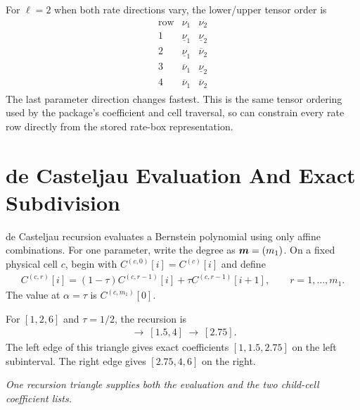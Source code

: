 For $\ell=2$ when both rate directions vary, the lower/upper tensor order is
\begin{gather*}
\begin{array}{c|cc}
\text{row} & \nu_1 & \nu_2\\
\hline
1 & \underline\nu_1 & \underline\nu_2\\
2 & \underline\nu_1 & \overline\nu_2\\
3 & \overline\nu_1 & \underline\nu_2\\
4 & \overline\nu_1 & \overline\nu_2
\end{array}
\end{gather*}
The last parameter direction changes fastest. This is the same tensor ordering used by the package's coefficient and cell traversal, so  can constrain every rate row directly from the stored rate-box representation.

\section{de Casteljau Evaluation And Exact Subdivision}

de Casteljau recursion evaluates a Bernstein polynomial using only affine combinations. For one parameter, write the degree as $\boldsymbol{m}=(m_1)$. On a fixed physical cell $c$, begin with $C^{(c,0)}[i]=C^{(c)}[i]$ and define
\begin{gather*}
C^{(c,r)}[i]=(1-\tau)C^{(c,r-1)}[i]
    +\tau C^{(c,r-1)}[i+1],
  \qquad r=1,\ldots,m_1.
\end{gather*}
The value at $\alpha=\tau$ is $C^{(c,m_1)}[0]$.

For $[1,2,6]$ and $\tau=1/2$, the recursion is
\begin{gather*}
[1,2,6]\ \longrightarrow\ [1.5,4]\ \longrightarrow\ [2.75].
\end{gather*}
The left edge of this triangle gives exact coefficients $[1,1.5,2.75]$ on the left subinterval. The right edge gives $[2.75,4,6]$ on the right.

\begin{center}

\medskip \textit{One recursion triangle supplies both the evaluation and the two child-cell coefficient lists.}
\end{center}

